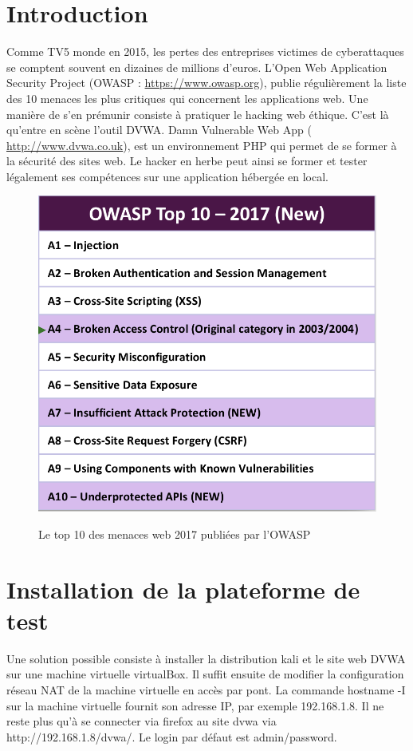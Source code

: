 
\pagebreak

\section*{Introduction}
Comme TV5 monde en 2015, les pertes des entreprises victimes de cyberattaques se comptent souvent en dizaines de millions d'euros. L'Open Web Application Security Project (OWASP : {\color{blue} \url{https://www.owasp.org}}), publie régulièrement la liste des 10 menaces les plus critiques qui concernent les applications web. Une manière de s'en prémunir consiste à pratiquer le hacking web éthique. C'est là qu'entre en scène l'outil DVWA. Damn Vulnerable Web App ({\color{blue} \url{http://www.dvwa.co.uk}}), est un environnement PHP qui permet de se former à la sécurité des sites web. Le hacker en herbe peut ainsi se former et tester légalement ses compétences sur une application hébergée en local. 

\begin{figure}[!h]
	\begin{center}
		\label{10_menaces}
		\includegraphics[scale=0.4]{images/10_menaces.png}
		\caption{Le top 10 des menaces web 2017 publiées par l'OWASP}
	\end{center}
\end{figure}

\section{Installation de la plateforme de test}
Une solution possible consiste à installer la distribution kali et le site web DVWA sur une machine virtuelle virtualBox.
Il suffit ensuite de modifier la configuration réseau NAT de la machine virtuelle en accès par pont.
La commande hostname -I sur la machine virtuelle fournit son adresse IP, par exemple 192.168.1.8. Il ne reste plus qu'à se connecter via firefox
au site dvwa via {\color{blue}http://192.168.1.8/dvwa/}. Le login par défaut est admin/password.

